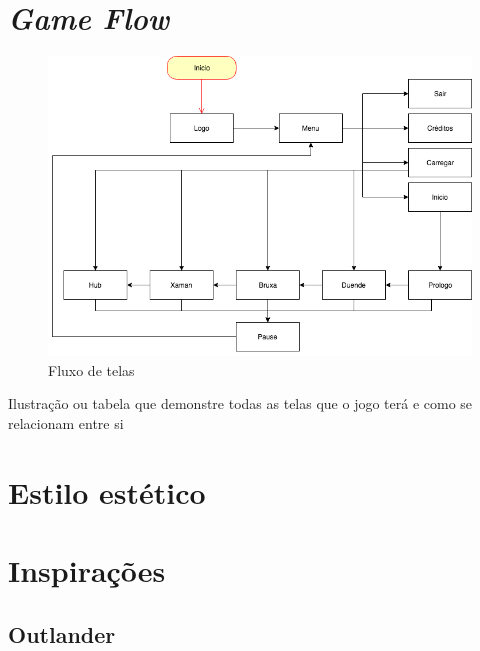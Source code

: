 \section{\textit{Game Flow}}
\begin{figure}[htb]
	\caption{\label{fig_grafico}Fluxo de telas}
	\begin{center}
	    \includegraphics[width=\textwidth]{imagens/Flow.png}
	\end{center}
\end{figure}
Ilustração ou tabela que demonstre todas as telas que o jogo terá e como se relacionam entre si

\section{Estilo estético}



\clearpage
\section{Inspirações}

\subsection{Outlander}

